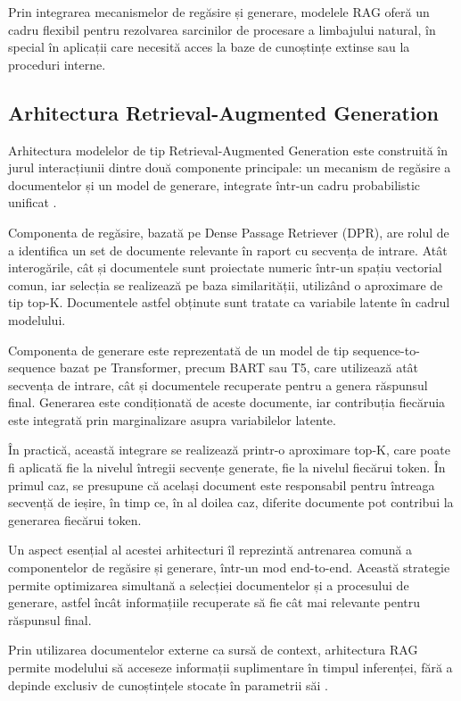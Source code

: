 \documentclass[12pt, a4paper, oneside, romanian]{teza-upb}
\begin{document}
Prin integrarea mecanismelor de regăsire și generare, modelele RAG oferă un cadru flexibil pentru rezolvarea sarcinilor de procesare a limbajului natural, în special în aplicații care necesită acces la baze de cunoștințe extinse \cite{lewis2020retrieval} sau la proceduri interne.


\subsection{Arhitectura Retrieval-Augmented Generation}

Arhitectura modelelor de tip Retrieval-Augmented Generation este construită în jurul interacțiunii dintre două componente principale: un mecanism de regăsire a documentelor și un model de generare, integrate într-un cadru probabilistic unificat \cite{lewis2020retrieval}.

Componenta de regăsire, bazată pe Dense Passage Retriever (DPR), are rolul de a identifica un set de documente relevante în raport cu secvența de intrare. Atât interogările, cât și documentele sunt proiectate numeric într-un spațiu vectorial comun, iar selecția se realizează pe baza similarității, utilizând o aproximare de tip top-K. Documentele astfel obținute sunt tratate ca variabile latente în cadrul modelului.

Componenta de generare este reprezentată de un model de tip sequence-to-sequence bazat pe Transformer, precum BART sau T5, care utilizează atât secvența de intrare, cât și documentele recuperate pentru a genera răspunsul final. Generarea este condiționată de aceste documente, iar contribuția fiecăruia este integrată prin marginalizare asupra variabilelor latente.

În practică, această integrare se realizează printr-o aproximare top-K, care poate fi aplicată fie la nivelul întregii secvențe generate, fie la nivelul fiecărui token. În primul caz, se presupune că același document este responsabil pentru întreaga secvență de ieșire, în timp ce, în al doilea caz, diferite documente pot contribui la generarea fiecărui token.

Un aspect esențial al acestei arhitecturi îl reprezintă antrenarea comună a componentelor de regăsire și generare, într-un mod end-to-end. Această strategie permite optimizarea simultană a selecției documentelor și a procesului de generare, astfel încât informațiile recuperate să fie cât mai relevante pentru răspunsul final.

Prin utilizarea documentelor externe ca sursă de context, arhitectura RAG permite modelului să acceseze informații suplimentare în timpul inferenței, fără a depinde exclusiv de cunoștințele stocate în parametrii săi \cite{lewis2020retrieval}.
\end{document}
